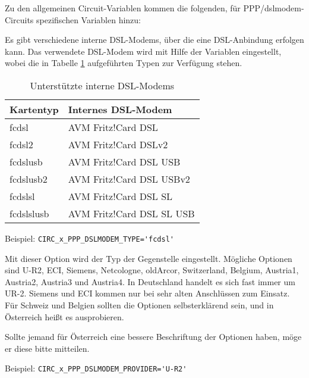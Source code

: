 Zu den allgemeinen Circuit-Variablen kommen die folgenden, für
PPP/dslmodem-Circuits spezifischen Variablen hinzu:

\begin{description}

Es gibt verschiedene interne DSL-Modems, über die eine DSL-Anbindung erfolgen
kann. Das verwendete DSL-Modem wird mit Hilfe der Variablen
 eingestellt, wobei die in Tabelle
\ref{tab:internal-dsl-modems} aufgeführten Typen zur Verfügung stehen.

\begin{table}[htb]
  \centering
  \begin{tabular}{l|l}
    Kartentyp & Internes DSL-Modem \\
    \hline
    fcdsl & AVM Fritz!Card DSL \\
    fcdsl2 & AVM Fritz!Card DSLv2 \\
    fcdslusb & AVM Fritz!Card DSL USB \\
    fcdslusb2 & AVM Fritz!Card DSL USBv2 \\
    fcdslsl & AVM Fritz!Card DSL SL \\
    fcdslslusb & AVM Fritz!Card DSL SL USB \\
  \end{tabular}
  \caption{Unterstützte interne DSL-Modems}
  \label{tab:internal-dsl-modems}
\end{table}

Beispiel: \verb+CIRC_x_PPP_DSLMODEM_TYPE='fcdsl'+


Mit dieser Option wird der Typ der Gegenstelle eingestellt. Mögliche Optionen
sind U-R2, ECI, Siemens, Netcologne, oldArcor, Switzerland, Belgium, Austria1,
Austria2, Austria3 und Austria4. In Deutschland handelt es sich fast immer um
UR-2. Siemens und ECI kommen nur bei sehr alten Anschlüssen zum Einsatz.
Für Schweiz und Belgien sollten die Optionen selbsterklärend sein, und in
Österreich heißt es ausprobieren.

Sollte jemand für Österreich eine bessere Beschriftung der Optionen haben, möge
er diese bitte mitteilen.

Beispiel: \verb+CIRC_x_PPP_DSLMODEM_PROVIDER='U-R2'+

\end{description}

